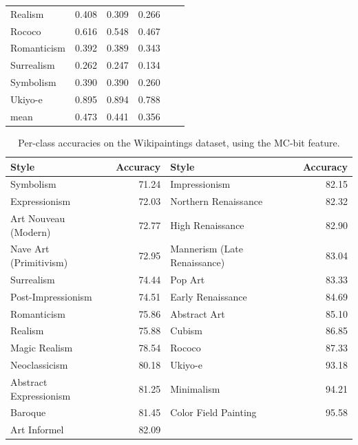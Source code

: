 \begin{table}[ht!]
\begin{tabular}{llllll}
Realism                        & 0.408            & 0.309  & 0.266      \\
Rococo                         & 0.616            & 0.548  & 0.467      \\
Romanticism                    & 0.392            & 0.389  & 0.343      \\
Surrealism                     & 0.262            & 0.247  & 0.134      \\
Symbolism                      & 0.390            & 0.390  & 0.260      \\
Ukiyo-e                        & 0.895            & 0.894  & 0.788      \\
\midrule
mean                           & 0.473            & 0.441  & 0.356      \\
\bottomrule
\end{tabular}
\end{table}

\begin{table}
\caption{
    Per-class accuracies on the Wikipaintings dataset, using the MC-bit feature.
}\label{tab:wp_accuracies}
\vspace{1em}
\centering
\begin{tabular}{lrlr}
\toprule
\textbf{Style} & \textbf{Accuracy} & \textbf{Style} & \textbf{Accuracy} \\
\midrule
Symbolism                    &         71.24 & Impressionism                &         82.15 \\
Expressionism                &         72.03 & Northern Renaissance         &         82.32 \\
Art Nouveau (Modern)         &         72.77 & High Renaissance             &         82.90 \\
Nave Art (Primitivism)       &         72.95 & Mannerism (Late Renaissance) &         83.04 \\
Surrealism                   &         74.44 & Pop Art                      &         83.33 \\
Post-Impressionism           &         74.51 & Early Renaissance            &         84.69 \\
Romanticism                  &         75.86 & Abstract Art                 &         85.10 \\
Realism                      &         75.88 & Cubism                       &         86.85 \\
Magic Realism                &         78.54 & Rococo                       &         87.33 \\
Neoclassicism                &         80.18 & Ukiyo-e                      &         93.18 \\
Abstract Expressionism       &         81.25 & Minimalism                   &         94.21 \\
Baroque                      &         81.45 & Color Field Painting         &         95.58 \\
Art Informel                 &         82.09 &                              &               \\
\bottomrule
\end{tabular}
\end{table}

